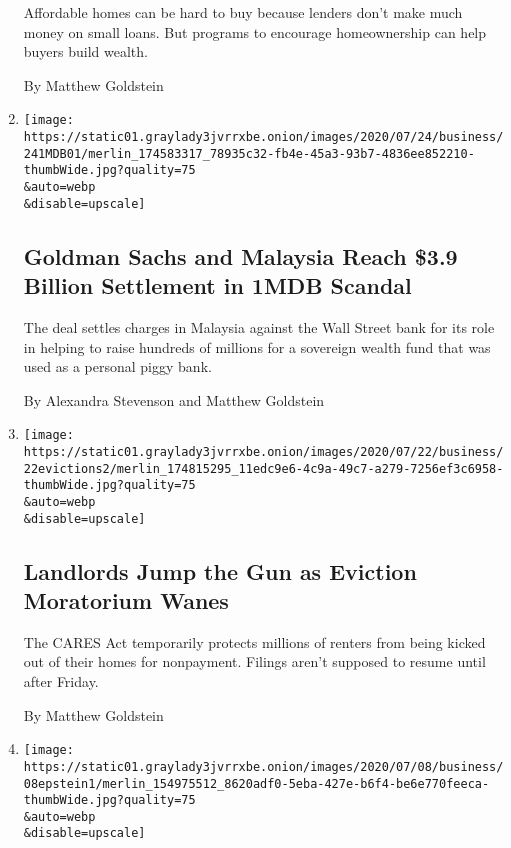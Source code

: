 \begin{enumerate}
  Affordable homes can be hard to buy because lenders don't make much
  money on small loans. But programs to encourage homeownership can help
  buyers build wealth.

  By Matthew Goldstein
\item
  \href{/2020/07/24/business/goldman-sachs-malaysia-1mdb.html}{}

  \texttt{[image: https://static01.graylady3jvrrxbe.onion/images/2020/07/24/business/241MDB01/merlin\_174583317\_78935c32-fb4e-45a3-93b7-4836ee852210-thumbWide.jpg?quality=75\\\&auto=webp\\\&disable=upscale]}

  \hypertarget{goldman-sachs-and-malaysia-reach-39-billion-settlement-in-1mdb-scandal}{%
  \subsection{Goldman Sachs and Malaysia Reach \$3.9 Billion Settlement
  in 1MDB
  Scandal}\label{goldman-sachs-and-malaysia-reach-39-billion-settlement-in-1mdb-scandal}}

  The deal settles charges in Malaysia against the Wall Street bank for
  its role in helping to raise hundreds of millions for a sovereign
  wealth fund that was used as a personal piggy bank.

  By Alexandra Stevenson and Matthew Goldstein
\item
  \href{/2020/07/23/business/evictions-moratorium-cares-act.html}{}

  \texttt{[image: https://static01.graylady3jvrrxbe.onion/images/2020/07/22/business/22evictions2/merlin\_174815295\_11edc9e6-4c9a-49c7-a279-7256ef3c6958-thumbWide.jpg?quality=75\\\&auto=webp\\\&disable=upscale]}

  \hypertarget{landlords-jump-the-gun-as-eviction-moratorium-wanes}{%
  \subsection{Landlords Jump the Gun as Eviction Moratorium
  Wanes}\label{landlords-jump-the-gun-as-eviction-moratorium-wanes}}

  The CARES Act temporarily protects millions of renters from being
  kicked out of their homes for nonpayment. Filings aren't supposed to
  resume until after Friday.

  By Matthew Goldstein
\item
  \href{/2020/07/07/business/jeffrey-epstein-deutsche-bank-settlement.html}{}

  \texttt{[image: https://static01.graylady3jvrrxbe.onion/images/2020/07/08/business/08epstein1/merlin\_154975512\_8620adf0-5eba-427e-b6f4-be6e770feeca-thumbWide.jpg?quality=75\\\&auto=webp\\\&disable=upscale]}


\end{enumerate}
